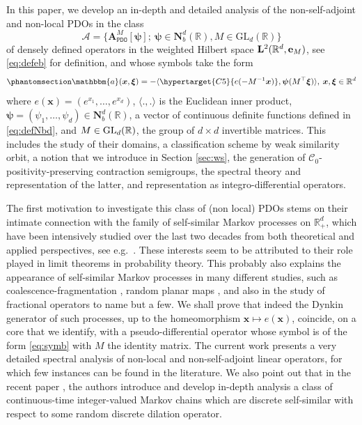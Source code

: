 \documentclass[12pt]{amsart}
\newcommand{\hlabel}{\phantomsection\label}
\newcommand{\hptg}[2]{\hypertarget{#1}{#2}}
\numberwithin{equation}{section}
\newcommand{\bb}{\mathbb}
\newcommand{\bbm}{\mathbbm}
\newcommand{\ttt}{\mathtt}
\newcommand{\bmrm}[2][2]{\mathbf{#2}^{#1}}
\newcommand{\NN}{\mathbf{N}}
\theoremstyle{definition}
\theoremstyle{assump}
\theoremstyle{remark}
\begin{document}
In this  paper, we  develop an  in-depth and detailed analysis of the non-self-adjoint and non-local PDOs in the class \begin{equation*}
\mathscr{A}=\{\bm{A}^M_{\ttt{PDO}}[\bm{\psi}]; \: \bm{\psi}\in\NN^d_b(\bb R), M\in\mathrm{GL}_d(\bb{R})\} \end{equation*}
of densely defined operators in the weighted Hilbert space $\bmrm{L}(\bb{R}^d,{\bf e}_M)$, see \eqref{eq:defeb} for definition, and whose symbols take the form
\begin{equation} \hlabel{eq:symb}
\bbm{a}(\bm{x},\bm{\xi})=-\langle \hptg{C5}{e(-M^{-1}\bm{x})},\bm{\psi}(M^\top\bm{\xi})\rangle, \: \bm{x},\bm{\xi}\in\bb{R}^d %
\end{equation}
where $e(\bm{x})=(e^{x_1},\ldots, e^{x_d})$, $\langle.,.\rangle$ is the Euclidean inner product, $\bm{\psi}=(\psi_1,\ldots,\psi_d)\in\mathbf{N}_b^d(\bb{R})$, a vector of  continuous definite functions defined in  \eqref{eq:defNbd}, and $M \in {\rm{GL}}_d(\bb{R})$, the group of $d\times d$  invertible matrices. This includes the study of their domains, a classification scheme by weak similarity orbit, a notion that we introduce in Section \ref{sec:ws}, the generation of $\mathcal{C}_0$- positivity-preserving contraction semigroups, the spectral theory and representation of the latter,
and representation as integro-differential operators.

The first motivation  to investigate  this class of (non local) PDOs stems on their intimate connection with the family of self-similar Markov processes on $\bb{R}_+^d$, which have been intensively studied over the
last two decades from both theoretical and applied perspectives, see e.g.~\cite{Lamperti1972,Caballero2006,Patie-abs-08}.
These interests seem to be  attributed to their role played in limit theorems in probability theory.  This probably also \hptg{C7}{explains} the appearance of self-similar Markov processes in
many different studies, such as coalescence-fragmentation \cite{Bertoin_Frag}, random planar maps \cite{Bertoin-Igor-16}, and also in the study of fractional operators \cite{Patie-Simon,patie_zhao2017} to name but a few.  We shall prove that indeed the Dynkin generator of such processes, up to the homeomorphism $\bm{x}\mapsto e(\bm{x})$, coincide, on a core that we identify, with a pseudo-differential operator whose symbol is of the form \eqref{eq:symb} with $M$ the identity matrix.  The current work presents a very detailed spectral analysis of non-local and non-self-adjoint linear operators, for which few instances can be found in the literature.
We also  point out that in the recent paper \cite{MPS}, the authors introduce and develop in-depth analysis a class of continuous-time integer-valued Markov chains which are discrete self-similar with respect to some random discrete dilation operator.
\end{document}
